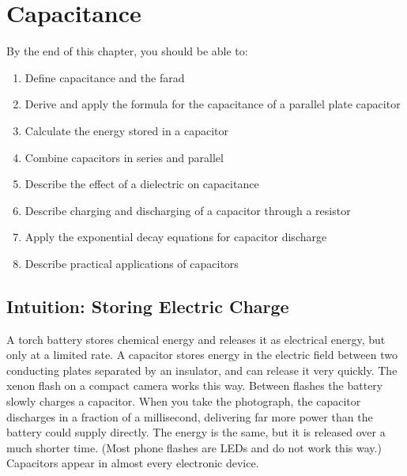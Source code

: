%

\chapter{Capacitance}
\label{ch:capacitance}
\minitoc
\newpage


\begin{objectivebox}
By the end of this chapter, you should be able to:
\begin{enumerate}[noitemsep]
  \item Define capacitance and the farad
  \item Derive and apply the formula for the
  capacitance of a parallel plate capacitor
  \item Calculate the energy stored in a capacitor
  \item Combine capacitors in series and parallel
  \item Describe the effect of a dielectric on
  capacitance
  \item Describe charging and discharging of a
  capacitor through a resistor
  \item Apply the exponential decay equations for
  capacitor discharge
  \item Describe practical applications of capacitors
\end{enumerate}
\end{objectivebox}

\section{Intuition: Storing Electric Charge}

A torch battery stores chemical energy and releases it as electrical
energy, but only at a limited rate. A capacitor stores energy in the
electric field between two conducting plates separated by an
insulator, and can release it very quickly. The xenon flash on a
compact camera works this way. Between flashes the battery slowly
charges a capacitor. When you take the photograph, the capacitor
discharges in a fraction of a millisecond, delivering far more power
than the battery could supply directly. The energy is the same, but
it is released over a much shorter time. (Most phone flashes are LEDs
and do not work this way.) Capacitors appear in almost every
electronic device.

